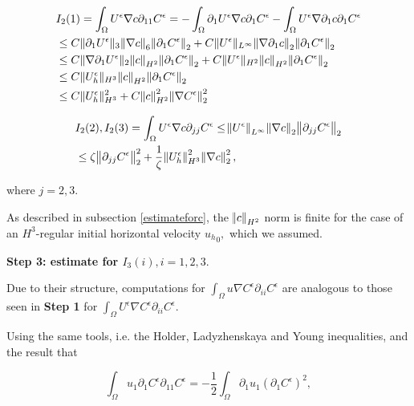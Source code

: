 \documentclass[11pt]{article}
\begin{document}
\begin{equation}
  \begin{split}
    & I_2(1) = \int_\Omega U^\epsilon \nabla c \partial_{11} C^\epsilon = -\int_\Omega \partial_1 U^\epsilon \nabla c \partial_1 C^\epsilon - \int_\Omega U^\epsilon \nabla \partial_1 c \partial_1 C^\epsilon \\
    & \leq C \| \partial_1 U^\epsilon \|_3 \norm{\nabla c}_6 \norm{\partial_1 C^\epsilon}_2 + C \| U^\epsilon \|_{L^\infty} \norm{\nabla \partial_1 c}_2 \norm{\partial_1 C^\epsilon}_2 \\
    & \leq C \| \nabla \partial_1 U^\epsilon \|_2 \norm{c}_{H^2} \norm{\partial_1 C^\epsilon}_2 + C \| U^\epsilon \|_{H^2} \norm{c}_{H^2} \norm{\partial_1 C^\epsilon}_2 \\
    & \leq C \|  U_h^\epsilon \|_{H^3} \norm{c}_{H^2} \norm{\partial_1 C^\epsilon}_2 \\
    & \leq C \|  U_h^\epsilon \|_{H^3}^2 + C \norm{c}_{H^2}^2 \norm{\nabla C^\epsilon}_2^2
  \end{split}
\end{equation}

\begin{equation}
  \begin{split}
  & I_2(2), I_2(3) = \int_\Omega U^\epsilon \nabla c \partial_{jj} C^\epsilon \leq \norm{U^\epsilon}_{L^\infty} \norm{\nabla c}_2 \norm{\partial_{jj} C^\epsilon}_2 \\
  & \leq \zeta \norm{\partial_{jj} C^\epsilon}_2^2 + \frac{1}{\zeta} \norm{U_h^\epsilon}_{H^3}^2 \norm{\nabla c}_2^2,
  \end{split}
\end{equation}

where $j = 2,3.$

As described in subsection \ref{estimateforc}, the $\norm{c}_{H^2}$ norm is finite for the case of an $H^3$-regular initial horizontal velocity ${u_h}_0,$ which we assumed.

\textbf{Step 3: estimate for $I_3(i), i=1,2,3.$}

Due to their structure, computations for $\int_\Omega u \nabla C^\epsilon \partial_{ii} C^\epsilon$ are analogous to those seen in \textbf{Step 1} for $ \int_\Omega U^\epsilon \nabla C^\epsilon \partial_{ii} C^\epsilon.$

Using the same tools, i.e. the Holder, Ladyzhenskaya and Young inequalities, and the result that

$$ \int_\Omega u_1 \partial_1 C^\epsilon \partial_{11} C^\epsilon = - \frac{1}{2} \int_\Omega \partial_1 u_1 (\partial_1 C^\epsilon)^2, $$
\end{document}
